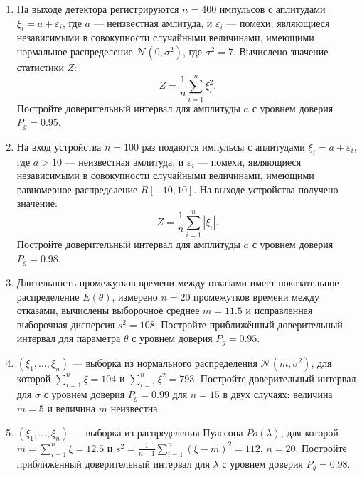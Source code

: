 \documentclass[a4paper,12pt]{article}
\newcommand{\modulus}[1]{\left | #1 \right |}
\newcommand{\sample}[2]{\left( #1_1, \dots, #1_{#2} \right)}
\begin{document}
    \begin{enumerate}[topsep=1cm, parsep=1cm, resume]
        \item На выходе детектора регистрируются $n = 400$ импульсов с аплитудами $\xi_i = a + \varepsilon_i$, где $a$ --- неизвестная амлитуда,
              и $\varepsilon_i$ --- помехи, являющиеся независимыми в совокупности случайными величинами, имеющими нормальное распределение
              $\mathcal{N} (0, \sigma^2)$, где $\sigma^2 = 7$. Вычислено значение статистики $Z$:
              \[
                  Z = \frac{1}{n} \sum_{i=1}^n \xi_i^2.
              \]
              Постройте доверительный интервал для амплитуды $a$ с уровнем доверия $P_g = 0.95$.

        \item На вход устройства $n = 100$ раз подаются импульсы с аплитудами $\xi_i = a + \varepsilon_i$, где $a > 10$ --- неизвестная амлитуда,
              и $\varepsilon_i$ --- помехи, являющиеся независимыми в совокупности случайными величинами, имеющими равномерное распределение
              $R[-10, 10]$. На выходе устройства получено значение:
              \[
                  Z = \frac{1}{n} \sum_{i=1}^n \modulus{\xi_i}.
              \]
              Постройте доверительный интервал для амплитуды $a$ с уровнем доверия $P_g = 0.98$.

        \item Длительность промежутков времени между отказами имеет показательное распределение $E(\theta)$, измерено $n=20$ промежутков времени между
              отказами, вычислены выборочное среднее $\overline{m} = 11.5$ и исправленная выборочная дисперсия $s^2 = 108$. Постройте приближённый доверительный
              интервал для параметра $\theta$ с уровнем доверия $P_g = 0.95$.

        \item $\sample{\xi}{n}$ --- выборка из нормального распределения $\mathcal{N}(m, \sigma^2)$, для которой $\sum_{i=1}^n \xi = 104$ и
              $\sum_{i=1}^n \xi^2 = 793$. Постройте доверительный интервал для $\sigma$ с уровнем доверия $P_g = 0.99$ для $n = 15$ в двух случаях:
              величина $m = 5$ и величина $m$ неизвестна.

              \item $\sample{\xi}{n}$ --- выборка из распределения Пуассона $Po(\lambda)$, для которой $m = \sum_{i=1}^n \xi = 12.5$ и 
              $s^2 = \frac{1}{n-1} \sum_{i=1}^n (\xi - m)^2 = 112$, $n = 20$. Постройте приближённый доверительный интервал для $\lambda$ с уровнем доверия
              $P_g = 0.98$.


\end{enumerate}
\end{document}
